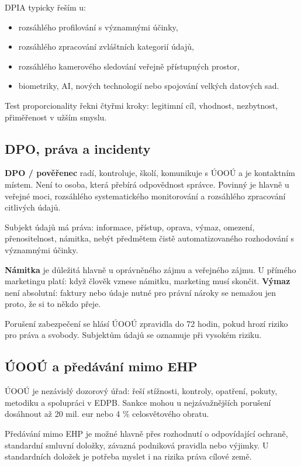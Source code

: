 DPIA typicky řeším u:
\begin{itemize}
  \item rozsáhlého profilování s významnými účinky,
  \item rozsáhlého zpracování zvláštních kategorií údajů,
  \item rozsáhlého kamerového sledování veřejně přístupných prostor,
  \item biometriky, AI, nových technologií nebo spojování velkých datových sad.
\end{itemize}

Test proporcionality řekni čtyřmi kroky: legitimní cíl, vhodnost, nezbytnost, přiměřenost v užším smyslu.

\subsection*{DPO, práva a incidenty}
\textbf{DPO / pověřenec} radí, kontroluje, školí, komunikuje s ÚOOÚ a je kontaktním místem. Není to osoba, která přebírá odpovědnost správce. Povinný je hlavně u veřejné moci, rozsáhlého systematického monitorování a rozsáhlého zpracování citlivých údajů.

Subjekt údajů má práva: informace, přístup, oprava, výmaz, omezení, přenositelnost, námitka, nebýt předmětem čistě automatizovaného rozhodování s významnými účinky.

\textbf{Námitka} je důležitá hlavně u oprávněného zájmu a veřejného zájmu. U přímého marketingu platí: když člověk vznese námitku, marketing musí skončit. \textbf{Výmaz} není absolutní: faktury nebo údaje nutné pro právní nároky se nemažou jen proto, že si to někdo přeje.

Porušení zabezpečení se hlásí ÚOOÚ zpravidla do 72 hodin, pokud hrozí riziko pro práva a svobody. Subjektům údajů se oznamuje při vysokém riziku.

\subsection*{ÚOOÚ a předávání mimo EHP}
ÚOOÚ je nezávislý dozorový úřad: řeší stížnosti, kontroly, opatření, pokuty, metodiku a spolupráci v EDPB. Sankce mohou u nejzávažnějších porušení dosáhnout až 20 mil. eur nebo 4 \% celosvětového obratu.

Předávání mimo EHP je možné hlavně přes rozhodnutí o odpovídající ochraně, standardní smluvní doložky, závazná podniková pravidla nebo výjimky. U standardních doložek je potřeba myslet i na rizika práva cílové země.

